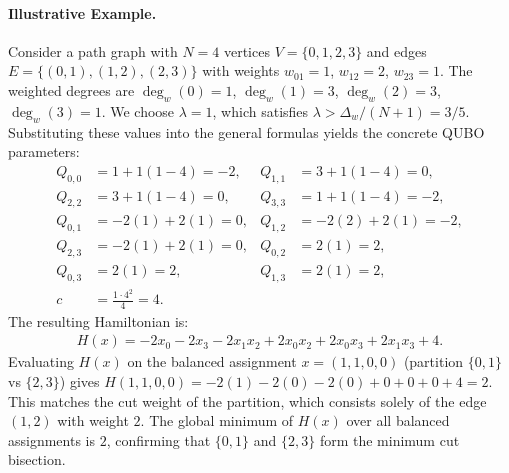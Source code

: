 \documentclass[12pt]{article}
\begin{document}
\paragraph{Illustrative Example.}
Consider a path graph with $N=4$ vertices $V=\{0,1,2,3\}$ and edges $E=\{(0,1), (1,2), (2,3)\}$ with weights $w_{01}=1$, $w_{12}=2$, $w_{23}=1$. The weighted degrees are $\deg_w(0)=1$, $\deg_w(1)=3$, $\deg_w(2)=3$, $\deg_w(3)=1$. We choose $\lambda=1$, which satisfies $\lambda > \Delta_w/(N+1) = 3/5$. Substituting these values into the general formulas yields the concrete QUBO parameters:
\begin{align}
    Q_{0,0} &= 1 + 1(1-4) = -2, & Q_{1,1} &= 3 + 1(1-4) = 0, \\
    Q_{2,2} &= 3 + 1(1-4) = 0, & Q_{3,3} &= 1 + 1(1-4) = -2, \\
    Q_{0,1} &= -2(1) + 2(1) = 0, & Q_{1,2} &= -2(2) + 2(1) = -2, \\
    Q_{2,3} &= -2(1) + 2(1) = 0, & Q_{0,2} &= 2(1) = 2, \\
    Q_{0,3} &= 2(1) = 2, & Q_{1,3} &= 2(1) = 2, \\
    c &= \frac{1 \cdot 4^2}{4} = 4.
\end{align}
The resulting Hamiltonian is:
\begin{align}
    H(x) = -2x_0 - 2x_3 - 2x_1 x_2 + 2x_0 x_2 + 2x_0 x_3 + 2x_1 x_3 + 4.
\end{align}
Evaluating $H(x)$ on the balanced assignment $x = (1,1,0,0)$ (partition $\{0,1\}$ vs $\{2,3\}$) gives $H(1,1,0,0) = -2(1) - 2(0) - 2(0) + 0 + 0 + 0 + 4 = 2$. This matches the cut weight of the partition, which consists solely of the edge $(1,2)$ with weight $2$. The global minimum of $H(x)$ over all balanced assignments is $2$, confirming that $\{0,1\}$ and $\{2,3\}$ form the minimum cut bisection.
\end{document}
